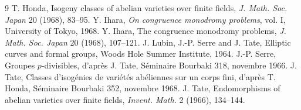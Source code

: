 \documentclass[12pt]{article}
\theoremstyle{plain}
\theoremstyle{definition}
\theoremstyle{remark}
\begin{document}
\begin{thebibliography}{9}
 T. Honda, Isogeny classes of abelian varieties over finite fields, \emph{J. Math. Soc. Japan} 20 (1968), 83--95.
 Y. Ihara, \emph{On congruence monodromy problems}, vol. I, University of Tokyo, 1968.
 Y. Ihara, The congruence monodromy problems, \emph{J. Math. Soc. Japan} 20 (1968), 107--121.
 J. Lubin, J.-P. Serre and J. Tate, Elliptic curves and formal groups, Woods Hole Summer Institute, 1964.
 J.-P. Serre, Groupes $p$-divisibles, d'après J. Tate, Séminaire Bourbaki 318, novembre 1966.
 J. Tate, Classes d'isogénies de variétés abéliennes sur un corps fini, d'après T. Honda, Séminaire Bourbaki 352, novembre 1968.
 J. Tate, Endomorphisms of abelian varieties over finite fields, \emph{Invent. Math.} 2 (1966), 134--144.
\end{thebibliography}
\end{document}
